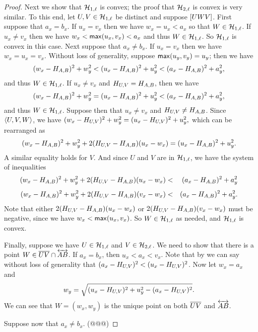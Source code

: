 \begin{proof}
Next we show that \(\mathcal{H}_{1,\ell}\) is convex; the proof that \(\mathcal{H}_{2,\ell}\) is convex is very similar. To this end, let \(U,V \in \mathcal{H}_{1,\ell}\) be distinct and suppose \([ U W V ]\).
First suppose that \(a_x = b_x\).
If \(u_x = v_x\) then we have \(w_x = u_x < a_x\) so that \(W \in \mathcal{H}_{1,\ell}\).
If \(u_x \neq v_x\) then we have \(w_x < \mathsf{max}(u_x,v_x) < a_x\) and thus \(W \in \mathcal{H}_{1,\ell}\).
So \(\mathcal{H}_{1,\ell}\) is convex in this case.
Next suppose that \(a_x \neq b_x\).
If \(u_x = v_x\) then we have \(w_x = u_x = v_x\).
Without loss of generality, suppose \(\mathsf{max}(u_y,v_y) = u_y\); then we have \[ (w_x - H_{A,B})^2 + w_y^2 < (u_x - H_{A,B})^2 + u_y^2 < (a_x - H_{A,B})^2 + a_y^2, \] and thus \(W \in \mathcal{H}_{1,\ell}\).
If \(u_x \neq v_x\) and \(H_{U,V} = H_{A,B}\), then we have \[ (w_x - H_{A,B})^2 + w_y^2 = (u_x - H_{A,B})^2 + u_y^2 < (a_x - H_{A,B})^2 + a_y^2, \] and thus \(W \in \mathcal{H}_{1,\ell}\).
Suppose then that \(u_x \neq v_x\) and \(H_{U,V} \neq H_{A,B}\).
Since \(\langle U, V, W \rangle\), we have \((w_x - H_{U,V})^2 + w_y^2 = (u_x - H_{U,V})^2 + u_y^2,\) which can be rearranged as \[ (w_x - H_{A,B})^2 + w_y^2 + 2(H_{U,V} - H_{A,B})(u_x - w_x) = (u_x - H_{A,B})^2 + u_y^2. \]
A similar equality holds for \(V\).
And since \(U\) and \(V\) are in \(\mathcal{H}_{1,\ell}\), we have the system of inequalities
\begin{eqnarray*}
(w_x - H_{A,B})^2 + w_y^2 + 2(H_{U,V} - H_{A,B})(u_x - w_x) & < & (a_x - H_{A,B})^2 + a_y^2 \\[4pt]
(w_x - H_{A,B})^2 + w_y^2 + 2(H_{U,V} - H_{A,B})(v_x - w_x) & < & (a_x - H_{A,B})^2 + a_y^2.
\end{eqnarray*}
Note that either \(2(H_{U,V} - H_{A,B})(u_x - w_x)\) or \(2(H_{U,V} - H_{A,B})(v_x - w_x)\) must be negative, since we have \(w_x < \mathsf{max}(u_x,v_x)\).
So \(W \in \mathcal{H}_{1,\ell}\) as needed, and \(\mathcal{H}_{1,\ell}\) is convex.

Finally, suppose we have \(U \in \mathcal{H}_{1,\ell}\) and \(V \in \mathcal{H}_{2,\ell}\).
We need to show that there is a point \(W \in \overline{UV} \cap \overleftrightarrow{AB}\).
If \(a_x = b_x\), then \(u_x < a_x < v_x\).
Note that by  we can say without loss of generality that \((a_x - H_{U,V})^2 < (u_x - H_{U,V})^2\).
Now let \(w_x = a_x\) and \[ w_y = \sqrt{(u_x - H_{U,V})^2 + u_y^2 - (a_x - H_{U,V})^2}. \]
We can see that \(W = (w_x,w_y)\) is the unique point on both \(\overline{UV}\) and \(\overleftrightarrow{AB}\).

Suppose now that \(a_x \neq b_x\).
(@@@)
\end{proof}
